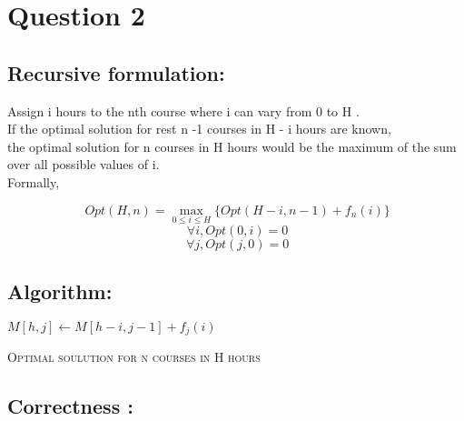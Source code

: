 \documentclass[11pt]{article}
\begin{document}
\section*{Question 2}

\subsection*{Recursive formulation:}

Assign i hours to the nth course where i can vary from 0 to H . \\

If the optimal solution for rest n -1 courses in H - i hours are known, \\

the optimal solution for n courses in H hours would be the maximum of the sum over all possible values of i. \\

Formally, 


\[
\ Opt(H,n) = \max_{0 \leq i \leq H} \{ Opt(H-i,n-1) + f_{n}(i) \} 
\]
\[
\  \forall i , Opt(0,i) = 0 
\]
\[
\  \forall j , Opt(j,0) = 0 
\]


\subsection*{Algorithm:}
\begin{algorithm}
 {
	 {
		 {
			 {
				$M[h,j] \leftarrow M[h-i,j-1] + f_j(i)$
				}
			}
	}
}
\caption{\textsc{Optimal soulution for n courses in H hours}}
\label{UID}
\end{algorithm}

\subsection*{Correctness :}
\end{document}
